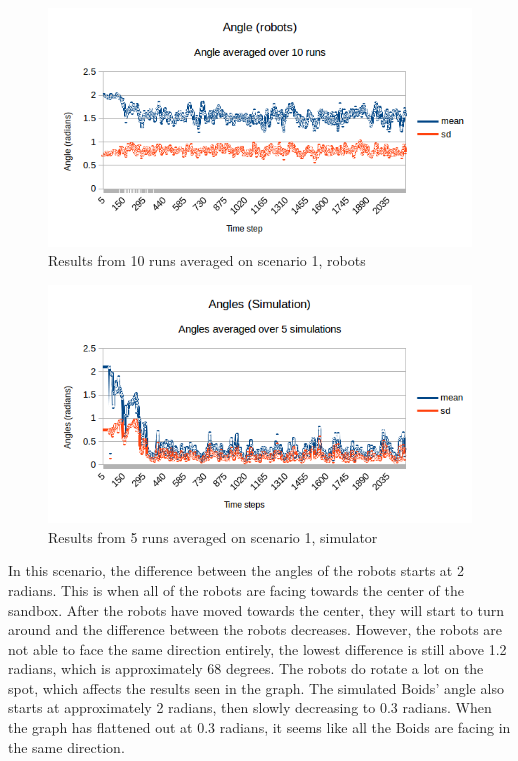 \begin{figure}[h]
\begin{center}
\includegraphics[width=0.8\linewidth]{figs/runs/1pangle}
\end{center}
\caption[1. Angle, robots]{Results from 10 runs averaged on scenario 1, robots}
\label{fig:res1pang}
\end{figure}
\begin{figure}[h]
\begin{center}
\includegraphics[width=0.8\linewidth]{figs/runs/1sangle}
\end{center}
\caption[1. Angle, Simulation]{Results from 5 runs averaged on scenario 1, simulator}
\label{fig:res1sang}
\end{figure}

In this scenario, the difference between the angles of the robots starts at 2 radians. This is when all of the robots are facing towards the center of the sandbox. After the robots have moved towards the center, they will start to turn around and the difference between the robots decreases. However, the robots are not able to face the same direction entirely, the lowest difference is still above 1.2 radians, which is approximately 68 degrees. The robots do rotate a lot on the spot, which affects the results seen in the graph.
The simulated Boids' angle also starts at approximately 2 radians, then slowly decreasing to 0.3 radians. When the graph has flattened out at 0.3 radians, it seems like all the Boids are facing in the same direction.


